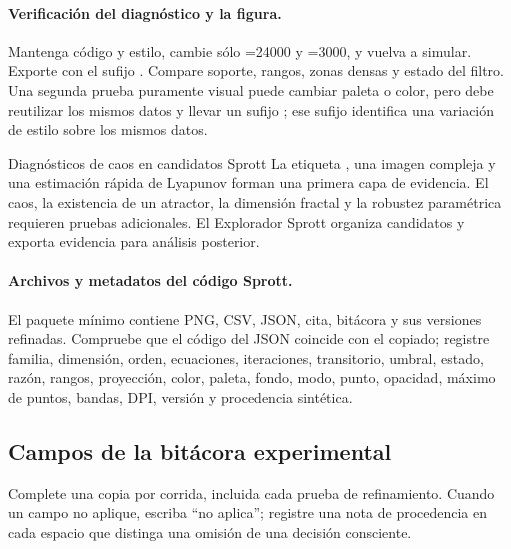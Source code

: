 
\paragraph{Verificación del diagnóstico y la figura.}
Mantenga código y estilo, cambie sólo
=24000 y =3000, y vuelva a
simular. Exporte con el sufijo . Compare soporte, rangos,
zonas densas y estado del filtro. Una segunda prueba puramente visual puede
cambiar paleta o color, pero debe reutilizar los mismos datos y llevar un sufijo
; ese sufijo identifica una variación de estilo sobre los mismos datos.

\begin{cajaalerta}{Diagnósticos de caos en candidatos Sprott}
La etiqueta , una imagen compleja y una estimación
rápida de Lyapunov forman una primera capa de evidencia. El caos, la existencia de un atractor, la dimensión
fractal y la robustez paramétrica requieren pruebas adicionales. El Explorador Sprott organiza
candidatos y exporta evidencia para análisis posterior.
\end{cajaalerta}

\paragraph{Archivos y metadatos del código Sprott.}
El paquete mínimo contiene PNG, CSV, JSON, cita, bitácora y sus versiones
refinadas. Compruebe que el código del JSON coincide con el copiado; registre
familia, dimensión, orden, ecuaciones, iteraciones, transitorio, umbral, estado,
razón, rangos, proyección, color, paleta, fondo, modo, punto, opacidad, máximo de
puntos, bandas, DPI, versión y procedencia sintética.

\subsection{Campos de la bitácora experimental}
\label{sec:bitacora-reproducible}

Complete una copia por corrida, incluida cada prueba de refinamiento. Cuando un
campo no aplique, escriba ``no aplica''; registre una nota de procedencia en
cada espacio que distinga una omisión de una decisión consciente.

